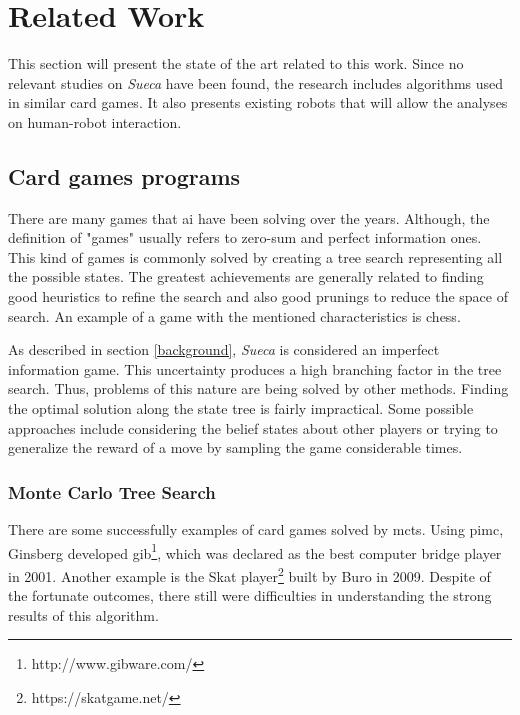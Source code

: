 \section{Related Work} \label{relatedwork}

This section will present the state of the art related to this work. Since no relevant studies on \emph{Sueca} have been found, the research includes algorithms used in similar card games. It also presents existing robots that will allow the analyses on human-robot interaction.


\subsection{Card games programs}
 
There are many games that \gls{ai} have been solving over the years. Although, the definition of "games" usually refers to zero-sum and perfect information ones. This kind of games is commonly solved by creating a tree search representing all the possible states. The greatest achievements are generally related to finding good heuristics to refine the search and also good prunings to reduce the space of search. An example of a game with the mentioned characteristics is chess.

As described in section \ref{background}, \emph{Sueca} is considered an imperfect information game. This uncertainty produces a high branching factor in the tree search. Thus, problems of this nature are being solved by other methods. Finding the optimal solution along the state tree is fairly impractical. Some possible approaches include considering the belief states about other players or trying to generalize the reward of a move by sampling the game considerable times.


\subsubsection{Monte Carlo Tree Search}

There are some successfully examples of card games solved by \gls{mcts}. Using \gls{pimc}, Ginsberg developed \gls{gib}\footnote{http://www.gibware.com/}, which was declared as the best computer bridge player in 2001. Another example is the Skat player\footnote{https://skatgame.net/} built by Buro in 2009.
Despite of the fortunate outcomes, there still were difficulties in understanding the strong results of this algorithm.

